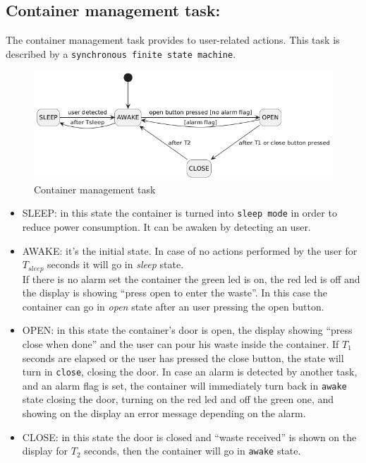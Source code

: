 \documentclass[a4paper,12pt]{report}
\begin{document}
        \subsection{Container management task:}

            The container management task provides to user-related actions.
            This task is described by a \texttt{synchronous finite state machine}. 

            \begin{figure}[H]
        	\centering{}
                \includegraphics[width=\textwidth]{img/container_task.png}
        	\caption{Container management task}
        	\label{img:container_task}
            \end{figure}

            
            \begin{itemize}
                \item SLEEP: in this state the container is turned into \texttt{sleep mode} in order to reduce power consumption. It can be awaken by detecting an user.
                \item AWAKE: it's the initial state. In case of no actions performed by the user for $T_{sleep}$ seconds it will go in \textit{sleep} state. \\
                If there is no alarm set the container the green led is on, the red led is off and the display is showing ``press open to enter the waste''. In this case the container can go in \textit{open} state after an user pressing the open button.
                \item OPEN: in this state the container's door is open, the display showing ``press close when done'' and the user can pour his waste inside the container. If $T_1$ seconds are elapsed or the user has pressed the close button, the state will turn in \texttt{close}, closing the door.
                In case an alarm is detected by another task, and an alarm flag is set, the container will immediately turn back in \texttt{awake} state closing the door, turning on the red led and off the green one, and showing on the display an error message depending on the alarm.
                \item CLOSE: in this state the door is closed and ``waste received'' is shown on the display for $T_2$ seconds, then the container will go in \texttt{awake} state. 
            \end{itemize}
\end{document}
